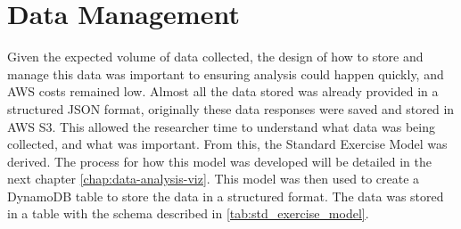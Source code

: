 \section{\label{sec:data-mgmt}Data Management}
Given the expected volume of data collected, the design of how to store and manage this data was important to ensuring analysis could happen quickly, and AWS costs remained low. Almost all the data stored was already provided in a structured JSON format, originally these data responses were saved and stored in AWS S3. This allowed the researcher time to understand what data was being collected, and what was important. From this, the Standard Exercise Model was derived. The process for how this model was developed will be detailed in the next chapter \ref{chap:data-analysis-viz}. This model was then used to create a DynamoDB table to store the data in a structured format. The data was stored in a table with the schema described in \autoref{tab:std_exercise_model}.
\begin{table}[h]
  \centering
  \caption[Standard Exercise Model Schema]{\label{tab:std_exercise_model}The schema for the "Standard Exercise Model"}
\end{table}

